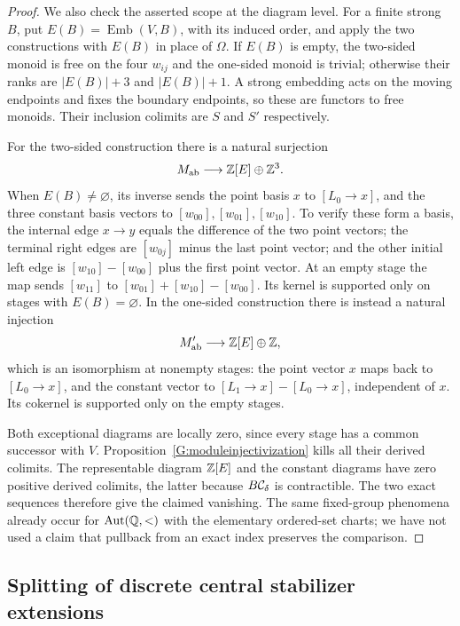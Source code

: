 \begin{proof}
We also check the asserted scope at the diagram level. For a
finite strong $B$, put $E(B)=\operatorname{Emb}(V,B)$, with its
induced order, and apply the two constructions with $E(B)$ in
place of $\Omega$. If $E(B)$ is empty, the two-sided monoid is
free on the four $w_{ij}$ and the one-sided monoid is trivial;
otherwise their ranks are $|E(B)|+3$ and $|E(B)|+1$.
A strong embedding acts on the moving endpoints and fixes the
boundary endpoints, so these are functors to free monoids.
Their inclusion colimits are $S$ and $S'$ respectively.

For the two-sided construction there is a natural surjection
\[
 M_{\mathrm{ab}}\longrightarrow\mathbb Z[E]\oplus\mathbb Z^3.
\]
When $E(B)\ne\varnothing$, its inverse sends the point basis
$x$ to $[L_0\to x]$, and the three constant basis vectors to
$[w_{00}],[w_{01}],[w_{10}]$. To verify these form a basis,
the internal edge $x\to y$ equals the difference of the two
point vectors; the terminal right edges are $[w_{0j}]$ minus
the last point vector; and the other initial left edge is
$[w_{10}]-[w_{00}]$ plus the first point vector.
At an empty stage the map sends
$[w_{11}]$ to $[w_{01}]+[w_{10}]-[w_{00}]$.
Its kernel is supported only on stages with $E(B)=\varnothing$.
In the one-sided construction there is instead a natural
injection
\[
 M'_{\mathrm{ab}}\longrightarrow\mathbb Z[E]\oplus\mathbb Z,
\]
which is an isomorphism at nonempty stages: the point vector
$x$ maps back to $[L_0\to x]$, and the constant vector to
$[L_1\to x]-[L_0\to x]$, independent of $x$.
Its cokernel is supported only on the empty stages.

Both exceptional diagrams are locally zero, since every stage
has a common successor with $V$. Proposition~\ref{G:moduleinjectivization}
kills all their derived colimits. The representable diagram
$\mathbb Z[E]$ and the constant diagrams have zero positive derived
colimits, the latter because $B\mathcal C_\delta$ is contractible.
The two exact sequences therefore give the claimed vanishing.
The same fixed-group phenomena already occur for
$\operatorname{Aut}(\mathbb Q,<)$ with the elementary ordered-set
charts; we have not used a claim that pullback from an exact
index preserves the comparison.
\end{proof}


\subsection{Splitting of discrete central stabilizer extensions}

